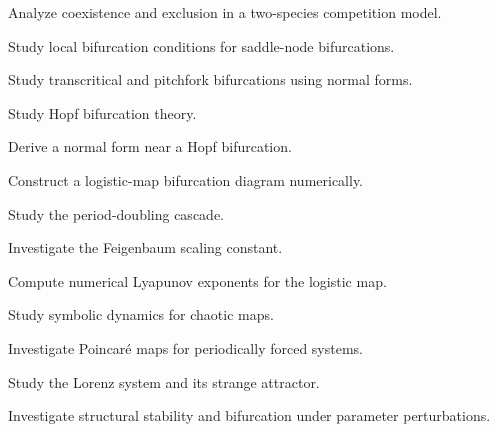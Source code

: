 \begin{exercise}[4]
Analyze coexistence and exclusion in a two-species competition model.
\end{exercise}

\begin{exercise}[4]
Study local bifurcation conditions for saddle-node bifurcations.
\end{exercise}

\begin{exercise}[4]
Study transcritical and pitchfork bifurcations using normal forms.
\end{exercise}

\begin{exercise}[4]
Study Hopf bifurcation theory.
\end{exercise}

\begin{exercise}[4]
Derive a normal form near a Hopf bifurcation.
\end{exercise}

\begin{exercise}[4]
Construct a logistic-map bifurcation diagram numerically.
\end{exercise}

\begin{exercise}[4]
Study the period-doubling cascade.
\end{exercise}

\begin{exercise}[4]
Investigate the Feigenbaum scaling constant.
\end{exercise}

\begin{exercise}[4]
Compute numerical Lyapunov exponents for the logistic map.
\end{exercise}

\begin{exercise}[4]
Study symbolic dynamics for chaotic maps.
\end{exercise}

\begin{exercise}[4]
Investigate Poincaré maps for periodically forced systems.
\end{exercise}

\begin{exercise}[4]
Study the Lorenz system and its strange attractor.
\end{exercise}

\begin{exercise}[4]
Investigate structural stability and bifurcation under parameter
perturbations.
\end{exercise}

